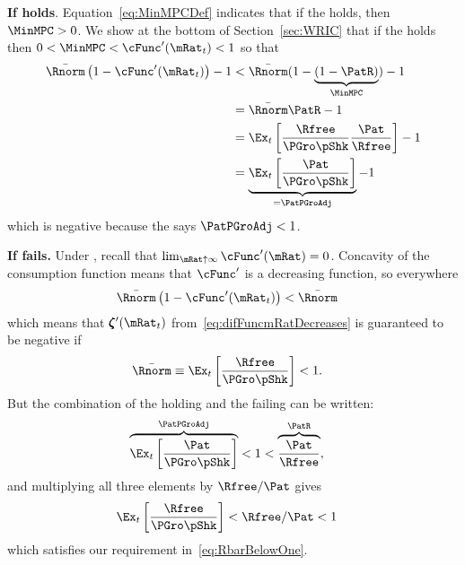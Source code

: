 \documentclass[\econtexRoot/BufferStockTheory]{subfiles}
\begin{document}
\textbf{If {\RIC} holds}. Equation~\eqref{eq:MinMPCDef} indicates that if the {\RIC} holds, then $\MinMPC >0$.  We show at the bottom of Section~\ref{sec:WRIC} that if the {\RIC} holds then $0 < \MinMPC < \cFunc^{\prime}(\mRat_{t}) < 1$ so that 
\begin{align*}
  \bar{\Rnorm}\left(1-\cFunc^{\prime}({\mRat}_t)\right) - 1 & <  \bar{\Rnorm}(1-\underbrace{(1-\PatR)}_{\MinMPC}) - 1  \\
                                                            & = \bar{\Rnorm}\PatR - 1 \\
                                                            & = \Ex_{t}\left[\frac{\Rfree}{\PGro \pShk}\frac{\Pat}{\Rfree}\right] - 1 \\
                                                            & = \underbrace{\Ex_{t}\left[\frac{\Pat}{\PGro \pShk}\right]}_{= \PatPGroAdj} - 1 
\end{align*}
which is negative because the {\GICNrm} says $\PatPGroAdj < 1$.  

\textbf{If {\RIC} fails.}
Under \cncl{\RIC}, recall that $\lim_{\mRat \uparrow \infty} \cFunc^{\prime}(\mRat) = 0$.  Concavity of the consumption function means that $\cFunc^{\prime}$ is a decreasing function, so everywhere 
\begin{align*}
  \bar{\Rnorm}\left(1-\cFunc^{\prime}({\mRat}_t)\right) & < \bar{\Rnorm}
\end{align*}
which means that $\difFunc^{\prime}(\mRat_{t})$ from~\eqref{eq:difFuncmRatDecreases} is guaranteed to be negative if
\begin{equation}\begin{gathered}\begin{aligned}
  \bar{\Rnorm} \equiv \Ex_{t}\left[\frac{\Rfree}{\PGro \pShk}\right] & < 1  \label{eq:RbarBelowOne}.
\end{aligned}\end{gathered}\end{equation}
But the combination of the {\GICNrm} holding and the {\RIC} failing can be written:
\begin{align*}
  \overbrace{\Ex_{t}\left[\frac{\Pat}{\PGro \pShk}\right]}^{\PatPGroAdj} & < 1 < \overbrace{\frac{\Pat}{\Rfree}}^{{\PatR}},
\end{align*}
and multiplying all three elements by $\Rfree/\Pat$ gives 
\begin{align*}
  \Ex_{t}\left[\frac{\Rfree}{\PGro \pShk}\right] & < \Rfree/\Pat < 1
\end{align*}
which satisfies our requirement in~\eqref{eq:RbarBelowOne}.
\end{document}
